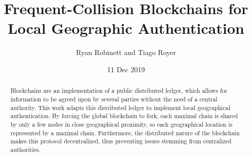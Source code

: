 \documentclass[twocolumn,10pt]{article}
\begin{document}
\title{Frequent-Collision Blockchains for Local Geographic Authentication}
\author{Ryan Robinett and Tiago Royer}
\date{11 Dec 2019}
\maketitle

\begin{abstract}
	Blockchains are an implementation of a public distributed ledger,
	which allows for information to be agreed upon by several parties
	without the need of a central authority.
	This work adapts this distributed ledger
	to implement local geographical authentication.
	By forcing the global blockchain to fork,
	each maximal chain is shared by only a few nodes in close geographical proximity,
	so each geographical location is represented by a maximal chain.
	Furthermore,
	the distributed nature of the blockchain
	makes this protocol decentralized,
	thus preventing issues stemming from centralized authorities.
\end{abstract}



















\end{document}
